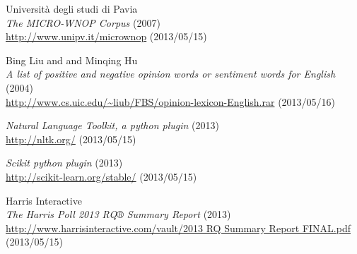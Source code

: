 \documentclass[a4paper,12pt]{report}
\begin{document}
\begin{thebibliography}{200}
  Università degli studi di Pavia\\
  \emph{The MICRO-WNOP Corpus} (2007)\\
  \url{http://www.unipv.it/micrownop} (2013/05/15)
  
  Bing Liu and and Minqing Hu\\
  \emph{A list of positive and negative opinion words or sentiment words for English} (2004)\\
  \url{http://www.cs.uic.edu/~liub/FBS/opinion-lexicon-English.rar} (2013/05/16)

  \emph{Natural Language Toolkit, a python plugin} (2013)\\ 
  \url{http://nltk.org/} (2013/05/15)
  
  \emph{Scikit python plugin} (2013)\\
  \url{http://scikit-learn.org/stable/} (2013/05/15)

  Harris Interactive\\
  \emph{The Harris Poll 2013 RQ® Summary Report} (2013)\\
  \url{http://www.harrisinteractive.com/vault/2013 RQ Summary Report FINAL.pdf} (2013/05/15)

\end{thebibliography}
\end{document}
